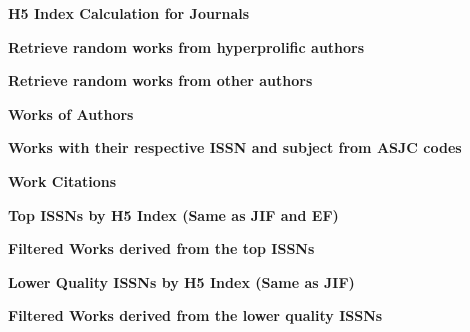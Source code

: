\textbf{H5 Index Calculation for Journals}





\textbf{Retrieve random works from hyperprolific authors}



\textbf{Retrieve random works from other authors}



\textbf{Works of Authors}





\textbf{Works with their respective ISSN and subject from ASJC codes}





\textbf{Work Citations}





\textbf{Top ISSNs by H5 Index (Same as JIF and EF)}



\textbf{Filtered Works derived from the top ISSNs}





\textbf{Lower Quality ISSNs by H5 Index (Same as JIF)}



\textbf{Filtered Works derived from the lower quality ISSNs}





